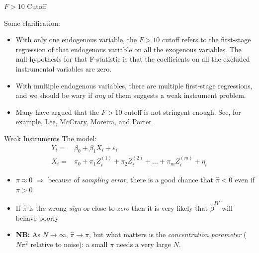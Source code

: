 \documentclass[aspectratio=169,11pt]{beamer}
\begin{document}
\begin{frame}{$F>10$ Cutoff}

Some clarification:

\begin{itemize}
		\item With only one endogenous variable, the $F>10$ cutoff refers to the first-stage regression of
		that endogenous variable on all the exogenous variables. The null hypothesis for that F-statistic is that
		the coefficients on all the excluded instrumental variables are zero.

		\medskip
		\item With multiple endogenous variables, there are multiple first-stage regressions, and we should 
		be wary if \emph{any} of them suggests a weak instrument problem.
		\medskip
		\item Many have argued that the $F>10$ cutoff is not stringent enough. See, for example, 
		\href{https://arxiv.org/abs/2010.05058}{Lee, McCrary, Moreira, and Porter} 

\end{itemize}
\end{frame}


\begin{frame}{Weak Instruments}
The model:
\begin{align*}
	Y_i =& \beta_0 + \beta_1 X_i + \varepsilon_i\\
	X_i =& \pi_0 + \pi_1 Z_i^{(1)} + \pi_2 Z_i^{(2)} + ... + \pi_m Z_i^{(m)}+ \eta_i
\end{align*}

	\begin{itemize}
		\item $\pi\approx 0$ $\Rightarrow$ because of \emph{sampling error}, there is a good chance that $\hat\pi<0$ even if $\pi>0$
		\item If $\hat\pi$ is the wrong \emph{sign} or close to \emph{zero} then it is very likely that $\hat\beta^{IV}$ will behave poorly
		\item {\bf NB:} As $N\to\infty$, $\hat\pi\to\pi$, but what matters is the \emph{concentration parameter} ($N\pi^2$ relative to noise): a small $\pi$ needs a very large $N$.
	\end{itemize}
\end{frame}
\end{document}
